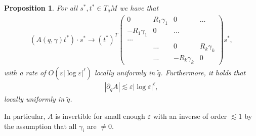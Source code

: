 \documentclass[10pt]{amsart}
\let\epsilon\varepsilon
\newtheorem{proposition}[theorem]{Proposition}
\theoremstyle{definition}
\let\de\partial
\let\eps\epsilon
\begin{document}
\begin{proposition}\label{conv A}
For all $s^*,t^*\in T_qM$ we have that
\begin{align*}(A(q,\gamma)t^*)\cdot s^*\to (t^*)^T\begin{pmatrix} 0 & R_1\gamma_1 &0 &\dots\\
-R_1\gamma_1 & 0 & \dots\\
\dots\\
 & \dots & 0 & R_k\gamma_k\\
 &\dots & -R_k\gamma_k & 0\end{pmatrix}s^*,
\end{align*}
with a rate of $O(\eps|{\log\eps}|^\ell)$ locally uniformly in $\tilde{q}$.
Furthermore, it holds that
\begin{align*}
\left|\de_q A\right|\lesssim \eps|{\log\eps}|^\ell,
\end{align*}
locally uniformly in $\tilde{q}$.
\end{proposition}
In particular, $A$ is invertible for small enough $\eps$ with an inverse of order $\lesssim 1$ by the assumption that all $\gamma_i$ are $\neq 0$.
\end{document}
